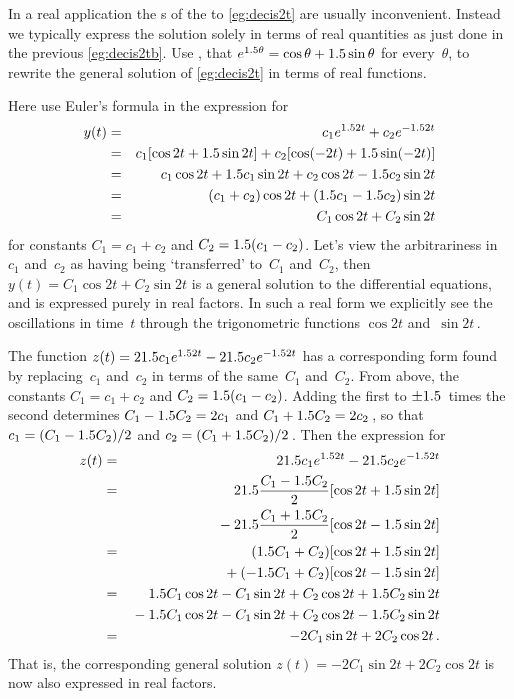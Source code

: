 \begin{example} \label{eg:realcis}
In a real application the s of the  to \autoref{eg:decis2t} are usually inconvenient.  
Instead we typically express the solution solely in terms of real quantities as just done in the previous \autoref{eg:decis2tb}.
Use , that \(e^{1.5\theta}=\cos\theta+1.5\sin\theta\) for every~\(\theta\), to rewrite the general solution of \autoref{eg:decis2t} in terms of real functions.
\begin{solution}
Here use Euler's formula in the expression for
\begin{eqnarray*}
y(t)&=&c_1e^{1.52t}+c_2e^{-1.52t}
\\&=&c_1[\cos 2t+1.5\sin2t]+c_2[\cos(-2t)+1.5\sin(-2t)]
\\&=&c_1\cos2t+1.5 c_1\sin2t +c_2\cos2t-1.5 c_2\sin2t
\\&=&(c_1+c_2)\cos2t +(1.5 c_1-1.5 c_2)\sin2t
\\&=&C_1\cos2t+C_2\sin2t
\end{eqnarray*}
for constants \(C_1=c_1+c_2\) and \(C_2=1.5(c_1-c_2)\).
Let's view the arbitrariness in~\(c_1\) and~\(c_2\) as having being `transferred' to~\(C_1\) and~\(C_2\), then \(y(t)=C_1\cos2t+C_2\sin2t\) is a general solution to the differential equations, and is expressed purely in real factors.
In such a real form we explicitly see the oscillations in time~\(t\) through the trigonometric functions \(\cos 2t\) and~\(\sin2t\)\,.

The function \(z(t)=21.5 c_1e^{1.52t}-21.5 c_2e^{-1.52t}\) has a corresponding form found by replacing~\(c_1\) and~\(c_2\) in terms of the same~\(C_1\) and~\(C_2\).
From above, the constants \(C_1=c_1+c_2\) and \(C_2=1.5(c_1-c_2)\).
Adding the first to \(\pm 1.5\)~times the second determines \(C_1-1.5 C_2=2c_1\) and \(C_1+1.5 C_2=2c_2\)\,, so that \(c_1=(C_1-1.5 C_2)/2\) and \(c_2=(C_1+1.5 C_2)/2\)\,.  
Then the expression for
\begin{eqnarray*}
z(t)&=&21.5 c_1e^{1.52t}-21.5 c_2e^{-1.52t}
\\&=&21.5\frac{C_1-1.5 C_2}2[\cos2t+1.5\sin2t]
\\&&{}
-21.5\frac{C_1+1.5 C_2}2[\cos2t-1.5\sin2t]
\\&=&(1.5 C_1+C_2)[\cos2t+1.5\sin2t]
\\&&{}
+(-1.5 C_1+C_2)[\cos2t-1.5\sin2t]
\\&=&1.5 C_1\cos2t-C_1\sin2t+C_2\cos2t+1.5 C_2\sin2t
\\&&{}
-1.5 C_1\cos2t-C_1\sin2t+C_2\cos2t-1.5 C_2\sin2t
\\&=&-2C_1\sin2t+2C_2\cos2t\,.
\end{eqnarray*}
That is, the corresponding general solution \(z(t)=-2C_1\sin2t+2C_2\cos2t\) is now also expressed in real factors.
\end{solution}
\end{example}




